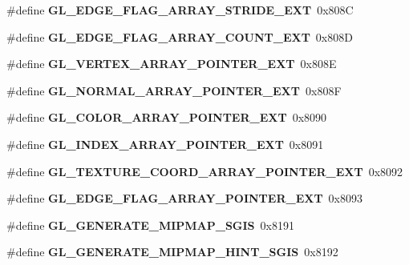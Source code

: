 \begin{DoxyCompactItemize}
\item 
\#define {\bfseries G\+L\+\_\+\+E\+D\+G\+E\+\_\+\+F\+L\+A\+G\+\_\+\+A\+R\+R\+A\+Y\+\_\+\+S\+T\+R\+I\+D\+E\+\_\+\+E\+X\+T}~0x808\+C\label{_s_d_l__opengl_8h_a0c94b362c3f8b77f12913aff80b90d51}

\item 
\#define {\bfseries G\+L\+\_\+\+E\+D\+G\+E\+\_\+\+F\+L\+A\+G\+\_\+\+A\+R\+R\+A\+Y\+\_\+\+C\+O\+U\+N\+T\+\_\+\+E\+X\+T}~0x808\+D\label{_s_d_l__opengl_8h_a020cc424168bf0aead42d056973f5c0c}

\item 
\#define {\bfseries G\+L\+\_\+\+V\+E\+R\+T\+E\+X\+\_\+\+A\+R\+R\+A\+Y\+\_\+\+P\+O\+I\+N\+T\+E\+R\+\_\+\+E\+X\+T}~0x808\+E\label{_s_d_l__opengl_8h_a7ad97bd4f0711821bc06a7661c9e2902}

\item 
\#define {\bfseries G\+L\+\_\+\+N\+O\+R\+M\+A\+L\+\_\+\+A\+R\+R\+A\+Y\+\_\+\+P\+O\+I\+N\+T\+E\+R\+\_\+\+E\+X\+T}~0x808\+F\label{_s_d_l__opengl_8h_a5296d3bfe6072e7e03da47231d2bc474}

\item 
\#define {\bfseries G\+L\+\_\+\+C\+O\+L\+O\+R\+\_\+\+A\+R\+R\+A\+Y\+\_\+\+P\+O\+I\+N\+T\+E\+R\+\_\+\+E\+X\+T}~0x8090\label{_s_d_l__opengl_8h_a312e8d1ce91a7c55157b545ee0b47d2a}

\item 
\#define {\bfseries G\+L\+\_\+\+I\+N\+D\+E\+X\+\_\+\+A\+R\+R\+A\+Y\+\_\+\+P\+O\+I\+N\+T\+E\+R\+\_\+\+E\+X\+T}~0x8091\label{_s_d_l__opengl_8h_aacf4bfb78c546c6e1536ddc82ab0207e}

\item 
\#define {\bfseries G\+L\+\_\+\+T\+E\+X\+T\+U\+R\+E\+\_\+\+C\+O\+O\+R\+D\+\_\+\+A\+R\+R\+A\+Y\+\_\+\+P\+O\+I\+N\+T\+E\+R\+\_\+\+E\+X\+T}~0x8092\label{_s_d_l__opengl_8h_a7269c0fdd29b47570503a3b3dddb0408}

\item 
\#define {\bfseries G\+L\+\_\+\+E\+D\+G\+E\+\_\+\+F\+L\+A\+G\+\_\+\+A\+R\+R\+A\+Y\+\_\+\+P\+O\+I\+N\+T\+E\+R\+\_\+\+E\+X\+T}~0x8093\label{_s_d_l__opengl_8h_ae1652570bf70bb83d37cb8559eb680dd}

\item 
\#define {\bfseries G\+L\+\_\+\+G\+E\+N\+E\+R\+A\+T\+E\+\_\+\+M\+I\+P\+M\+A\+P\+\_\+\+S\+G\+I\+S}~0x8191\label{_s_d_l__opengl_8h_a88a81c788f81e0325a66e8294aa59a4e}

\item 
\#define {\bfseries G\+L\+\_\+\+G\+E\+N\+E\+R\+A\+T\+E\+\_\+\+M\+I\+P\+M\+A\+P\+\_\+\+H\+I\+N\+T\+\_\+\+S\+G\+I\+S}~0x8192\label{_s_d_l__opengl_8h_aacb38307723117d051220be785bbcd79}


\end{DoxyCompactItemize}
